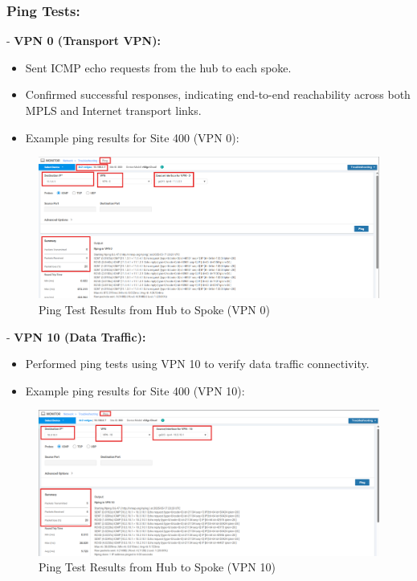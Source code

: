 \documentclass[12pt,english]{report}
\begin{document}
\subsubsection{Ping Tests:}
- \textbf{VPN 0 (Transport VPN):}
  \begin{itemize}
      \item Sent ICMP echo requests from the hub to each spoke.
      \item Confirmed successful responses, indicating end-to-end reachability across both MPLS and Internet transport links.
      \item Example ping results for Site 400 (VPN 0):
  \end{itemize}
    \begin{figure}[H]
        \centering
        \includegraphics[width=1\textwidth]{chapter 4/hub-spoke-ping.png}
        \caption{Ping Test Results from Hub to Spoke (VPN 0)}
        \label{fig:ping_vpn0}
    \end{figure}
- \textbf{VPN 10 (Data Traffic):}
  \begin{itemize}
      \item Performed ping tests using VPN 10 to verify data traffic connectivity.
      \item Example ping results for Site 400 (VPN 10):
  \end{itemize}
    \begin{figure}[H]
        \centering
        \includegraphics[width=1\textwidth]{chapter 4/hub-spoke-ping-vpn10.png}
        \caption{Ping Test Results from Hub to Spoke (VPN 10)}
        \label{fig:ping_vpn10}
    \end{figure}
\end{document}

